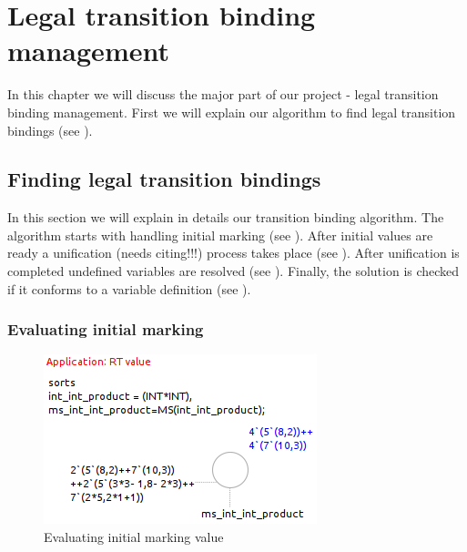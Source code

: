 \chapter{Legal transition binding management}\label{chapter:binding-management}

In this chapter we will discuss the major part of our project - legal transition binding management. First we will explain our algorithm to find legal transition bindings (see ).

\section{Finding legal transition bindings}\label{section:find-bindings}

In this section we will explain in details our transition binding algorithm. The algorithm starts with handling initial marking (see ). After initial values are ready a unification (needs citing!!!) process takes place (see ). After unification is completed undefined variables are resolved (see ). Finally, the solution is checked if it conforms to a variable definition (see ).

\subsection{Evaluating initial marking}\label{subs:handling-rt}

\begin{figure}[!htb]
  \includegraphics{img/rt-value-test.png}
  \caption{Evaluating initial marking value}\label{fig:rt-value-test}
\end{figure}

